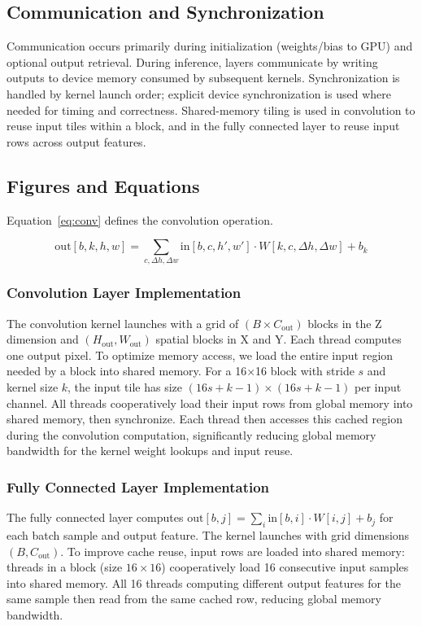 \documentclass[11pt]{article}
\begin{document}
\subsection{Communication and Synchronization}
Communication occurs primarily during initialization (weights/bias to GPU) and optional output retrieval. During inference, layers communicate by writing outputs to device memory consumed by subsequent kernels. Synchronization is handled by kernel launch order; explicit device synchronization is used where needed for timing and correctness. Shared-memory tiling is used in convolution to reuse input tiles within a block, and in the fully connected layer to reuse input rows across output features.

\subsection{Figures and Equations}
Equation~\eqref{eq:conv} defines the convolution operation.

\begin{equation}
\label{eq:conv}
\mathrm{out}[b,k,h,w] = \sum_{c,\Delta h,\Delta w} \mathrm{in}[b,c,h',w'] \cdot W[k,c,\Delta h,\Delta w] + b_k
\end{equation}

\subsubsection{Convolution Layer Implementation}
The convolution kernel launches with a grid of $(B \times C_{\text{out}})$ blocks in the Z dimension and $(H_{\text{out}}, W_{\text{out}})$ spatial blocks in X and Y. Each thread computes one output pixel. To optimize memory access, we load the entire input region needed by a block into shared memory. For a 16×16 block with stride $s$ and kernel size $k$, the input tile has size $(16s + k - 1) \times (16s + k - 1)$ per input channel. All threads cooperatively load their input rows from global memory into shared memory, then synchronize. Each thread then accesses this cached region during the convolution computation, significantly reducing global memory bandwidth for the kernel weight lookups and input reuse.

\subsubsection{Fully Connected Layer Implementation}
The fully connected layer computes $\mathrm{out}[b,j] = \sum_i \mathrm{in}[b,i] \cdot W[i,j] + b_j$ for each batch sample and output feature. The kernel launches with grid dimensions $(B, C_{\text{out}})$. To improve cache reuse, input rows are loaded into shared memory: threads in a block (size $16 \times 16$) cooperatively load 16 consecutive input samples into shared memory. All 16 threads computing different output features for the same sample then read from the same cached row, reducing global memory bandwidth.
\end{document}
